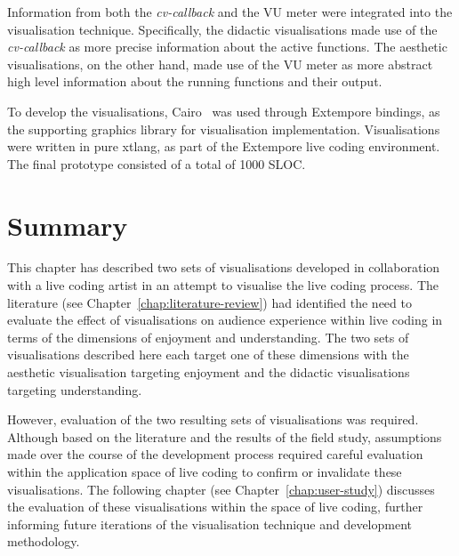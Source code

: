 Information from both the \textit{cv-callback} and the \ac{VU} meter were integrated into the visualisation technique. Specifically, the didactic visualisations made use of the \textit{cv-callback} as more precise information about the active functions. The aesthetic visualisations, on the other hand, made use of the \ac{VU} meter as more abstract high level information about the running functions and their output.

To develop the visualisations, Cairo~\cite{Worth2012} was used through Extempore bindings, as the supporting graphics library for visualisation implementation. Visualisations were written in pure xtlang, as part of the Extempore live coding environment. The final prototype consisted of a total of 1000 \ac{SLOC}.




\section{Summary}

This chapter has described two sets of visualisations developed in collaboration with a live coding artist in an attempt to visualise the live coding process. The literature (see Chapter~\ref{chap:literature-review}) had identified the need to evaluate the effect of visualisations on audience experience within live coding in terms of the dimensions of enjoyment and understanding. The two sets of visualisations described here each target one of these dimensions with the aesthetic visualisation targeting enjoyment and the didactic visualisations targeting understanding. 

However, evaluation of the two resulting sets of visualisations was required. Although based on the literature and the results of the field study, assumptions made over the course of the development process required careful evaluation within the application space of live coding to confirm or invalidate these visualisations. The following chapter (see Chapter~\ref{chap:user-study}) discusses the evaluation of these visualisations within the space of live coding, further informing future iterations of the visualisation technique and development methodology.



